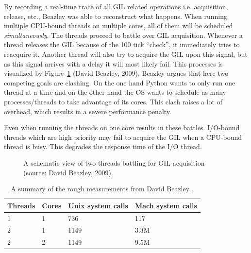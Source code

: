 By recording a real-time trace of all GIL related operations i.e. acquisition, release, etc., Beazley was able to reconstruct what happens.
When running multiple CPU-bound threads on multiple cores, all of them will be scheduled \emph{simultaneously}.
The threads proceed to battle over GIL acquisition. 
Whenever a thread releases the GIL because of the 100 tick ``check'', it immediately tries to reacquire it.
Another thread will also try to acquire the GIL upon this signal, but as this signal arrives with a delay it will most likely fail.
This processes is visualized by Figure~\ref{fig:gil_battle_threads} (David Beazley, 2009).
Beazley argues that here two competing goals are clashing.
On the one hand Python wants to only run one thread at a time and on the other hand the OS wants to schedule as many processes/threads to take advantage of its cores.
This clash raises a lot of overhead, which results in a severe performance penalty.

Even when running the threads on one core results in these battles.
I/O-bound threads which are high priority may fail to acquire the GIL when a CPU-bound thread is busy.
This degrades the response time of the I/O thread.

 \begin{figure}[t!]
 	\caption{A schematic view of two threads battling for GIL acquisition (source: David Beazley, 2009).}
 	\label{fig:gil_battle_threads}
 \end{figure}

\begin{table}[]
	\centering
	\begin{tabular}{|l|l|l|l|}
		\hline
	\textbf{Threads}	& \textbf{Cores} & \textbf{Unix system calls} & \textbf{Mach system calls} \\ \hline
	1	& 1 & 736 & 117 \\ \hline
	2	& 1 & 1149 & 3.3M \\ \hline
	2	& 2 & 1149 & 9.5M \\ \hline
	\end{tabular}
	\caption{A summary of the rough measurements from David Beazley \cite{beazley2009inside}.}
	\label{tbl:system_calls_thread_switching}
\end{table}



